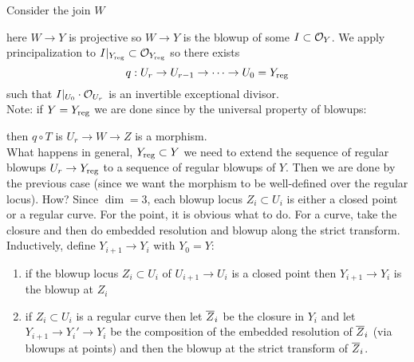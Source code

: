 \documentclass[12pt]{article}
\begin{document}
Consider the join $W$
\begin{center}
\end{center}
here $W \to Y$ is projective so $W \to Y$ is the blowup of some $I \subset \mathcal{O}_{Y}$. We apply principalization to $I|_{Y_{\mathrm{reg}}} \subset \mathcal{O}_{Y_{\mathrm{reg}}}$ so there exists
\[ q : U_r \to U_{r-1} \to \cdots \to U_0 = Y_{\mathrm{reg}} \]
such that $I|_{U_0} \cdot \mathcal{O}_{U_r}$ is an invertible exceptional divisor. 
\\
Note: if $Y = Y_{\mathrm{reg}}$ we are done since by the universal property of blowups:
\begin{center}
\end{center}

then $q \circ T$ is $U_r \to W \to Z$ is a morphism. 
\\
What happens in general, $Y_{\mathrm{reg}} \subset Y$ we need to extend the sequence of regular blowups $U_r \to Y_{\mathrm{reg}}$ to a sequence of regular blowups of $Y$. Then we are done by the previous case (since we want the morphism to be well-defined over the regular locus). How? Since $\dim = 3$, each blowup locus $Z_i \subset U_i$ is either a closed point or a regular curve. For the point, it is obvious what to do. For a curve, take the closure and then do embedded resolution and blowup along the strict transform. 
\\
Inductively, define $Y_{i+1} \to Y_{i}$ with $Y_0 = Y$:
\begin{enumerate}
\item if the blowup locus $Z_i \subset U_i$ of $U_{i+1} \to U_i$ is a closed point then $Y_{i+1} \to Y_i$ is the blowup at $Z_i$
\item if $Z_i \subset U_i$ is a regular curve then let $\overline{Z}_i$ be the closure in $Y_i$ and let $Y_{i+1} \to Y_i' \to Y_i$ be the composition of the embedded resolution of $\overline{Z}_i$ (via blowups at points) and then the blowup at the strict transform of $\overline{Z}_i$. 
\end{enumerate}
\end{document}
